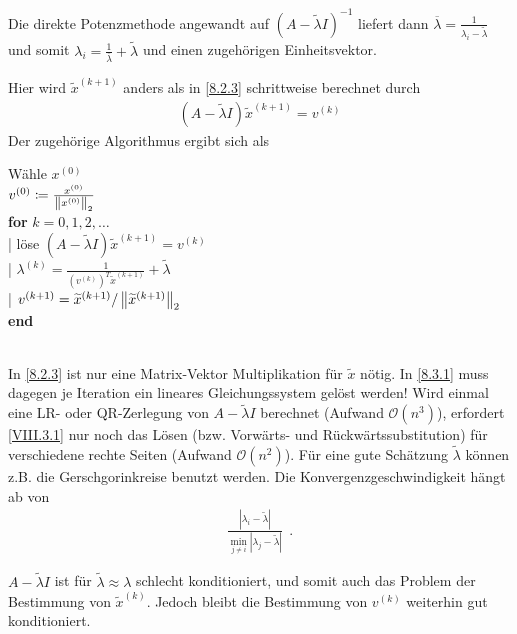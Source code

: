 
Die direkte Potenzmethode angewandt auf
$(A-\widetilde{\lambda}I)^{-1}$
liefert dann
$\overline{\lambda}=\frac{1}{\lambda_i-\widetilde{\lambda}}$
und somit $\lambda_i=\frac{1}{\overline{\lambda}}+\widetilde{\lambda}$
und einen zugehörigen Einheitsvektor.


\label{8.3.1}
Hier wird $\widetilde{x}^{(k+1)}$ anders als in \ref{8.2.3}
schrittweise berechnet durch
\begin{gather}
  (A-\widetilde{\lambda}I)\widetilde{x}^{(k+1)}=v^{(k)}
\label{VIII.3.1}
\end{gather}
Der zugehörige Algorithmus ergibt sich als

\begin{pseudocode}{0.5\linewidth}
  Wähle $x^{(0)}$ \\
  $v^{(0)} \coloneqq \frac{x^{(0)}}{\left\| x^{(0)} \right\|_2} $\\
  \textbf{for} $k=0,1,2,\ldots$ \\
  |\> löse
  $(A-\widetilde{\lambda}I)\widetilde{x}^{(k+1)}=v^{(k)}$\\
  |\> $\lambda^{(k)} = \frac{1}{\left(v^{(k)}\right)^T \widetilde{x}^{(k+1)}}
    + \widetilde{\lambda}$\\
  |\> $v^{(k+1)} = \widetilde{x}^{(k+1)}/\left\| \widetilde{x}^{(k+1)} \right\|_2$\\
  \textbf{end}
\end{pseudocode}\\

In \ref{8.2.3} ist nur eine Matrix-Vektor Multiplikation für
$\widetilde{x}$ nötig.
In \ref{8.3.1} muss dagegen je Iteration ein lineares Gleichungssystem
gelöst werden!
Wird einmal eine LR- oder QR-Zerlegung von $A-\widetilde{\lambda}I$
berechnet (Aufwand $\mathcal{O}(n^3)$), 
erfordert \eqref{VIII.3.1} nur noch das Lösen
(bzw. Vorwärts- und Rückwärtssubstitution)
für verschiedene rechte Seiten (Aufwand $\mathcal{O}(n^2)$).
Für eine gute Schätzung $\widetilde{\lambda}$ können 
z.B. die Gerschgorinkreise benutzt werden.
Die Konvergenzgeschwindigkeit hängt ab von
\begin{gather*}
  \frac{\left| \lambda_i-\widetilde{\lambda}\right|}
  {\min_{j\neq i} \left| \lambda_j-\widetilde{\lambda}\right|}~~.
\end{gather*}

\begin{Beme}\label{8.3.2}\cite[siehe][]{deuflhardhohmann}
$A-\widetilde{\lambda}I$ ist für $\widetilde{\lambda}\approx\lambda$
schlecht konditioniert, und somit auch das Problem
der Bestimmung von $\widetilde{x}^{(k)}$.
Jedoch bleibt die Bestimmung von $v^{(k)}$ weiterhin gut
konditioniert.  
\end{Beme}





